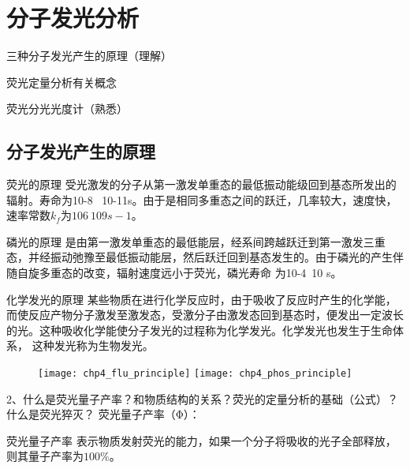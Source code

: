 \chapter{分子发光分析}

\begin{introduction}
	\item 三种分子发光产生的原理（理解）
	\item 荧光定量分析有关概念
	\item 荧光分光光度计（熟悉）
\end{introduction}



\section{分子发光产生的原理}

\begin{emptytcb*}{荧光的原理}{}
	受光激发的分子从第一激发单重态的最低振动能级回到基态所发出的辐射。寿命为10-8~ 10-11s。由于是相同多重态之间的跃迁，几率较大，速度快，速率常数$k_f$为$106~109 s-1$。
\end{emptytcb*}

\begin{emptytcb*}{磷光的原理}{}
	是由第一激发单重态的最低能层，经系间跨越跃迁到第一激发三重态，并经振动弛豫至最低振动能层，然后跃迁回到基态发生的。由于磷光的产生伴随自旋多重态的改变，辐射速度远小于荧光，磷光寿命 为10-4~10 s。
\end{emptytcb*}

\begin{emptytcb*}{化学发光的原理}{}
	 某些物质在进行化学反应时，由于吸收了反应时产生的化学能，而使反应产物分子激发至激发态，受激分子由激发态回到基态时，便发出一定波长的光。这种吸收化学能使分子发光的过程称为化学发光。化学发光也发生于生命体系， 这种发光称为生物发光。
\end{emptytcb*}

\begin{figure}
	\centering
	\texttt{[image: chp4\_flu\_principle]}
	\label{fig:chp4fluprinciple}
	\texttt{[image: chp4\_phos\_principle]}
	\label{fig:chp4phosprinciple}
	\caption{}
\end{figure}



2、什么是荧光量子产率？和物质结构的关系？荧光的定量分析的基础（公式）？什么是荧光猝灭？
荧光量子产率（Φ）：
\begin{definition*}{荧光量子产率}{}
	 表示物质发射荧光的能力，如果一个分子将吸收的光子全部释放，则其量子产率为$100\%$。
\end{definition*}

